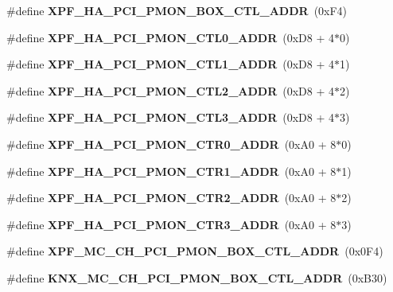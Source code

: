 \begin{DoxyCompactItemize}
\item 
\mbox{\label{types_8h_a3e2656bd4ea0dbb66efa5739b6a8f6dc}} 
\#define {\bfseries X\+P\+F\+\_\+\+H\+A\+\_\+\+P\+C\+I\+\_\+\+P\+M\+O\+N\+\_\+\+B\+O\+X\+\_\+\+C\+T\+L\+\_\+\+A\+D\+DR}~(0x\+F4)
\item 
\mbox{\label{types_8h_a85ce655a6f1003a4bc0cf58d7410750e}} 
\#define {\bfseries X\+P\+F\+\_\+\+H\+A\+\_\+\+P\+C\+I\+\_\+\+P\+M\+O\+N\+\_\+\+C\+T\+L0\+\_\+\+A\+D\+DR}~(0x\+D8 + 4$\ast$0)
\item 
\mbox{\label{types_8h_a821c8a29fa39482800c4b1597bea9cf0}} 
\#define {\bfseries X\+P\+F\+\_\+\+H\+A\+\_\+\+P\+C\+I\+\_\+\+P\+M\+O\+N\+\_\+\+C\+T\+L1\+\_\+\+A\+D\+DR}~(0x\+D8 + 4$\ast$1)
\item 
\mbox{\label{types_8h_a1336aa2a8749ca382469d730a0db3a24}} 
\#define {\bfseries X\+P\+F\+\_\+\+H\+A\+\_\+\+P\+C\+I\+\_\+\+P\+M\+O\+N\+\_\+\+C\+T\+L2\+\_\+\+A\+D\+DR}~(0x\+D8 + 4$\ast$2)
\item 
\mbox{\label{types_8h_a8a5c4f85712089e0a910a9cbf6756dfa}} 
\#define {\bfseries X\+P\+F\+\_\+\+H\+A\+\_\+\+P\+C\+I\+\_\+\+P\+M\+O\+N\+\_\+\+C\+T\+L3\+\_\+\+A\+D\+DR}~(0x\+D8 + 4$\ast$3)
\item 
\mbox{\label{types_8h_a54ff0531c4953f5bfefc22656f7519ec}} 
\#define {\bfseries X\+P\+F\+\_\+\+H\+A\+\_\+\+P\+C\+I\+\_\+\+P\+M\+O\+N\+\_\+\+C\+T\+R0\+\_\+\+A\+D\+DR}~(0x\+A0 + 8$\ast$0)
\item 
\mbox{\label{types_8h_a850df438cd4e9e5a186aab55fce325f9}} 
\#define {\bfseries X\+P\+F\+\_\+\+H\+A\+\_\+\+P\+C\+I\+\_\+\+P\+M\+O\+N\+\_\+\+C\+T\+R1\+\_\+\+A\+D\+DR}~(0x\+A0 + 8$\ast$1)
\item 
\mbox{\label{types_8h_ad0a19ca6c0ac293e9e13829d55dbfe81}} 
\#define {\bfseries X\+P\+F\+\_\+\+H\+A\+\_\+\+P\+C\+I\+\_\+\+P\+M\+O\+N\+\_\+\+C\+T\+R2\+\_\+\+A\+D\+DR}~(0x\+A0 + 8$\ast$2)
\item 
\mbox{\label{types_8h_ae45197bc2641540c41a32a4701605730}} 
\#define {\bfseries X\+P\+F\+\_\+\+H\+A\+\_\+\+P\+C\+I\+\_\+\+P\+M\+O\+N\+\_\+\+C\+T\+R3\+\_\+\+A\+D\+DR}~(0x\+A0 + 8$\ast$3)
\item 
\#define \textbf{ X\+P\+F\+\_\+\+M\+C\+\_\+\+C\+H\+\_\+\+P\+C\+I\+\_\+\+P\+M\+O\+N\+\_\+\+B\+O\+X\+\_\+\+C\+T\+L\+\_\+\+A\+D\+DR}~(0x0\+F4)
\item 
\mbox{\label{types_8h_af89e56851106b111118795b691525245}} 
\#define {\bfseries K\+N\+X\+\_\+\+M\+C\+\_\+\+C\+H\+\_\+\+P\+C\+I\+\_\+\+P\+M\+O\+N\+\_\+\+B\+O\+X\+\_\+\+C\+T\+L\+\_\+\+A\+D\+DR}~(0x\+B30)
\item 
\mbox{\label{types_8h_ac0429edcad61063c00506b88477f12fd}} 

\end{DoxyCompactItemize}
